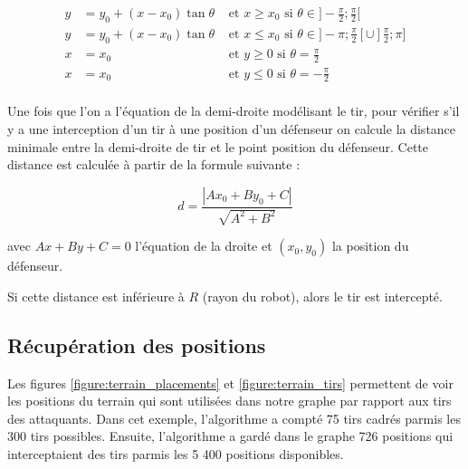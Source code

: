 \documentclass[12pt]{article}
\begin{document}
\begin{align*}
y & =  y_0 + (x - x_0)\tan \theta & \text{ et $x \geqslant x_0$ si } \theta \in ]-\frac{\pi}{2}; \frac{\pi}{2} [ \\
y & = y_0 + (x - x_0)\tan \theta & \text{ et $x \leqslant x_0$ si } \theta \in ]-\pi; \frac{\pi}{2}[ \cup ]\frac{\pi}{2}; \pi ] \\
x & = x_0  & \text{ et $y \geqslant 0$ si } \theta = \frac{\pi}{2} \\
x & = x_0  & \text{ et $y \leqslant 0$ si } \theta = -\frac{\pi}{2} \\
\end{align*}

Une fois que l'on a l'équation de la demi-droite modélisant le tir, pour vérifier s'il y a une interception d'un tir à une position d'un défenseur on calcule la distance minimale entre la demi-droite de tir et le point position du défenseur. Cette distance est calculée à partir de la formule suivante :

\begin{equation*}
  d = \frac{|Ax_0 + By_0 + C|}{\sqrt{A^2+B^2}}
\end{equation*}

avec $Ax+By+C = 0$ l'équation de la droite et $(x_0, y_0)$ la position du défenseur.

 Si cette distance est inférieure à $R$ (rayon du robot), alors le tir est intercepté.

\subsection{Récupération des positions}

Les figures \ref{figure:terrain_placements} et \ref{figure:terrain_tirs} permettent de voir les positions du terrain qui sont utilisées dans notre graphe par rapport aux tirs des attaquants. Dans cet exemple, l'algorithme a compté 75 tirs cadrés parmis les 300 tirs possibles. Ensuite, l'algorithme a gardé dans le graphe 726 positions qui interceptaient des tirs parmis les 5 400 positions disponibles.
\end{document}
